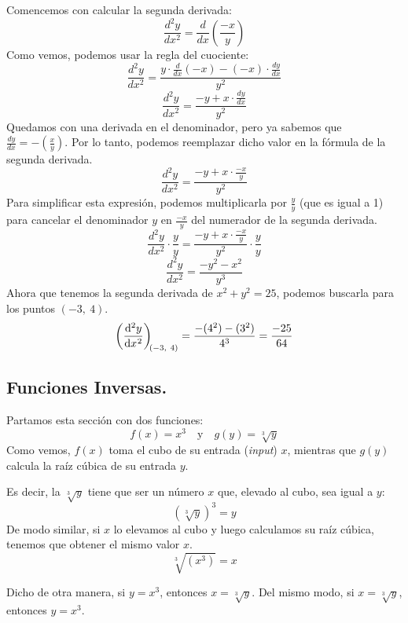 \documentclass[12pt]{article}
\begin{document}
Comencemos con calcular la segunda derivada:
\[\frac{d^{2}y}{dx^{2}} = \frac{d}{dx} \left(\frac{-x}{y}\right)\]
Como vemos, podemos usar la regla del cuociente:
\[\frac{d^{2}y}{dx^{2}} = \frac{y \cdot \frac{d}{dx}(-x) - (-x) \cdot \frac{dy}{dx}}{y^{2}}\]
\[\frac{d^{2}y}{dx^{2}} = \frac{-y + x \cdot \frac{dy}{dx}}{y^{2}}\]
Quedamos con una derivada en el denominador, pero ya sabemos que $\frac{dy}{dx} = -\left(\frac{x}{y}\right)$. Por lo tanto, podemos reemplazar dicho valor en la fórmula de la segunda derivada.
\[\frac{d^{2}y}{dx^{2}} = \frac{-y + x \cdot \frac{-x}{y}}{y^{2}}\]
Para simplificar esta expresión, podemos multiplicarla por $\frac{y}{y}$ (que es igual a 1) para cancelar el denominador $y$ en $\frac{-x}{y}$ del numerador de la segunda derivada.
\[\frac{d^{2}y}{dx^{2}} \cdot \frac{y}{y} = \frac{-y + x \cdot \frac{-x}{y}}{y^{2}} \cdot \frac{y}{y}\]
\[\frac{d^{2}y}{dx^{2}} = \frac{-y^{2} - x^{2}}{y^{3}}\]
Ahora que tenemos la segunda derivada de $x^{2} + y^{2} = 25$, podemos buscarla para los puntos $(-3, \ 4)$.
\[\diff[2]yx[(-3, \ 4)] = \frac{-(4^{2}) - (3^{2})}{4^{3}} = \frac{-25}{64}\]




\subsection{Funciones Inversas.}

Partamos esta sección con dos funciones:
\[f(x) = x^{3} \quad \text{y} \quad g(y) = \sqrt[3]{y}\]
Como vemos, $f(x)$ toma el cubo de su entrada (\textit{input}) $x$, mientras que $g(y)$ calcula la raíz cúbica de su entrada $y$.

Es decir, la $\sqrt[3]{y}$ tiene que ser un número $x$ que, elevado al cubo, sea igual a $y$:
\[(\sqrt[3]{y})^{3} = y\]
De modo similar, si $x$ lo elevamos al cubo y luego calculamos su raíz cúbica, tenemos que obtener el mismo valor $x$.
\[\sqrt[3]{(x^{3})} = x\]

\newpage

Dicho de otra manera, si $y = x^{3}$, entonces $x = \sqrt[3]{y}$. Del mismo modo, si $x = \sqrt[3]{y}$, entonces $y = x^{3}$.

\begin{figure}[hbt!]
\centering


\end{figure}
\end{document}
